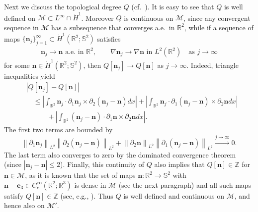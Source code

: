 \documentclass{amsart}
\numberwithin{equation}{section}
\theoremstyle{definition}
\theoremstyle{remark}
\newcommand{\R}{\mathbb{R}}
\newcommand{\Z}{\mathbb{Z}}
\renewcommand{\S}{\mathbb{S}}
\newcommand{\boM}{\mathcal{M}}
\newcommand{\nor}[2]{\left\| {#1} \right\|_{#2}}		%
\newcommand{\rd}{{\partial}}								%
\newcommand{\nab}{{\nabla}}							%
\newcommand{\bn}{{\mathbf{n}}}
\newcommand{\boe}{{\mathbf{e}}}
\begin{document}
Next we discuss the topological degree $Q$ 
(cf.\ \cite{MR728866}).
It is easy to see that $Q$ is well defined  on $\boM \subset  L^\infty\cap \dot{H}^1$.
Moreover $Q$ is continuous on $\boM$, since any convergent sequence in $\boM$ has a subsequence that converges a.e.\ in $\R^2$, while if a sequence of maps $\{\bn_j\}_{j=1}^\infty\subset \dot{H}^1(\R^2;\S^2)$ satisfies
\begin{align*}
\bn_j
\to \bn \text{ a.e.\ in }\R^2,\qquad
\nab \bn_j \to \nab \bn \text{ in } L^2(\R^2)\quad 
\text{as } j\to\infty
\end{align*}
for some $\bn \in \dot{H}^1(\R^2;\S^2)$,
then $Q[\bn_j] \to Q[\bn]$ as $j\to\infty$. 
Indeed, triangle inequalities yield
\begin{align*}
&|Q[\bn_j] - Q[\bn]|\\
& \quad \leq
\left|\int_{\R^2} \bn_j \cdot\rd_1 \bn_j \times \rd_2(\bn_j-\bn) dx \right|
+
\left|
\int_{\R^2} \bn_j \cdot\rd_1 (\bn_j -\bn )\times \rd_2 \bn dx\right| \\
&\quad\qquad +
\left|
\int_{\R^2} (\bn_j-\bn) \cdot \rd_1 \bn\times \rd_2 \bn dx\right|.
\end{align*}
The first two terms are bounded by
$$
\nor{\rd_1 \bn_j}{L^2} \nor{\rd_2 (\bn_j-\bn)}{L^2} + \nor{\rd_2 \bn}{L^2} \nor{\rd_1 (\bn_j-\bn)}{L^2}
 \xrightarrow{j\to\infty} 0.
$$
The last term also converges to zero by the dominated convergence theorem (since $|\bn_j-\bn|\leq2$).
Finally, this continuity of $Q$ also implies that $Q[\bn]\in \Z$ for $\bn\in\boM$, as it is known that the set of maps $\bn:\R^2\to\S^2$ with $\bn-\boe_3\in C_c^\infty (\R^2;\R^3)$ is dense in $\boM$ (see the next paragraph) and all such maps satisfy $Q[\bn]\in\Z$ (see, e.g., \cite[Section 1.4]{MR488102}). 
Thus $Q$ is well defined and continuous on $\boM$, and hence also on $\boM'$.
\end{document}
